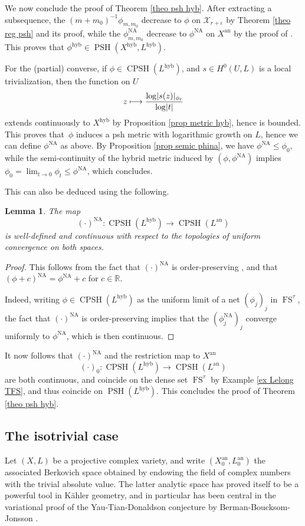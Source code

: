 \documentclass[JEP,XML,SOM,Unicode,published]{cedram}
\newcommand\mto{\mathchoice{\longmapsto}{\mapsto}{\mapsto}{\mapsto}}
\newtheorem{lem}[equation]{Lemma}
\theoremstyle{definition}
\newcommand \R{\mathbb R}
\newcommand \X {\mathscr{X}}
\let\eps\varepsilon
\newcommand{\an}{\mathrm{an}}
\DeclareMathOperator{\CPSH}{CPSH}
\DeclareMathOperator{\FS}{FS}
\newcommand{\hyb}{\mathrm{hyb}}
\DeclareMathOperator{\NA}{NA}
\DeclareMathOperator{\PSH}{PSH}
\begin{document}
We now conclude the proof of Theorem \ref{theo psh hyb}. After extracting a subsequence, the $(m+m_0)^{-1} \phi_{m, m_0}$ decrease to $\phi$ on $\X_{r+\eps}$ by Theorem \ref{theo reg psh} and its proof, while the $\phi^{\NA}_{m, m_0}$ decrease to $\phi^{\NA}$ on $X^{\an}$ by the proof of \cite[Th.\,3.3.1]{Reb}. This proves that $\phi^{\hyb} \in \PSH(X^{\hyb}, L^{\hyb})$.

For the (partial) converse, if $\phi \in \CPSH(L^{\hyb})$, and $s \in H^0(U, L)$ is a local trivialization, then the function on $U$
\[
z \mto \frac{\log \lvert s(z) \rvert_{\phi_t}}{\log \lvert t \rvert}
\]
extends continuously to $X^{\hyb}$ by Proposition \ref{prop metric hyb}, hence is bounded. This proves that~$\phi$ induces a psh metric with logarithmic growth on $L$, hence we can define $\phi^{\NA}$ as above. By Proposition \ref{prop semic phina}, we have $\phi^{\NA} \le \phi_0$, while the semi-continuity of the hybrid metric induced by $(\phi, \phi^{\NA})$ implies $\phi_0 = \lim_{t \to 0} \phi_t \le \phi^{\NA}$, which concludes.

This can also be deduced using the following.
\begin{lem} The map
\[
(\cdot)^{\NA}: \CPSH(L^{\hyb}) \to \CPSH(L^{\an})
\]
is well-defined and continuous with respect to the topologies of uniform convergence on both spaces.
\end{lem}
\begin{proof}This follows from the fact that $(\cdot)^{\NA}$ is order-preserving \cite[Th.\,3.3.1]{Reb}, and that $(\phi+c)^{\NA} = \phi^{\NA} +c$ for $c \in \R$.

Indeed, writing $\phi \in \CPSH(L^{\hyb})$ as the uniform limit of a net $(\phi_j)_j$ in $\FS^{\tau}$, the fact that $(\cdot)^{\NA}$ is order-preserving implies that the $(\phi_j^{\NA})_j$ converge uniformly to $\phi^{\NA}$, which is then continuous.
\end{proof}
It now follows that $(\cdot)^{\NA}$ and the restriction map to $X^{\an}$
\[
(\cdot)_{0}: \CPSH(L^{\hyb}) \to \CPSH(L^{\an})
\]
are both continuous, and coincide on the dense set $\FS^{\tau}$ by Example \ref{ex Lelong TFS}, and thus coincide on $\PSH(L^{\hyb})$. This concludes the proof of Theorem \ref{theo psh hyb}.
\subsection{The isotrivial case}
Let $(X,L)$ be a projective complex variety, and write $(X_0^{\an}, L_0^{\an})$ the associated Berkovich space obtained by endowing the field of complex numbers with the trivial absolute value. The latter analytic space has proved itself to be a powerful tool in Kähler geometry, and in particular has been central in the variational proof of the Yau-Tian-Donaldson conjecture by Berman-Boucksom-Jonsson \cite{BBJ}.
\end{document}
